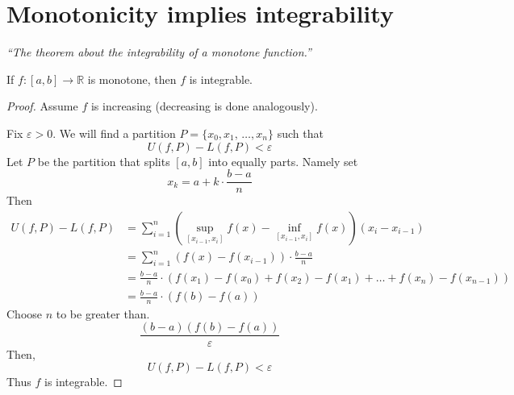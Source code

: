 \documentclass[12pt]{report}
\begin{document}
    \section{Monotonicity implies integrability}
    \textit{``The theorem about the integrability of a monotone function.''} \vspace{3mm}
    \begin{theorem}
        If \(f:[a,b] \to \mathbb{R}\) is monotone, then \(f\) is integrable.
    \end{theorem}
    \begin{proof}
        Assume \(f\) is increasing (decreasing is done analogously).

        Fix \(\varepsilon > 0\). We will find a partition \(P = \{x_0, x_1, \, \dots, x_n\}\) such that 
        \[U(f,P) - L(f,P) < \varepsilon\]
        Let \(P\) be the partition that splits \([a,b]\) into equally parts. Namely set
        \[x_k = a + k \cdot \frac{b-a}{n}\]
        Then
        \begin{align*}
            U(f,P) - L(f,P) &= \sum^n _{i=1} \left( \underset{[x_{i-1}, x_i]}{\sup} f(x) - \underset{[x_{i-1}, x_i]}{\inf} f(x)\right) \left(x_i - x_{i-1}\right)\\
            &= \sum^n_{i=1} \left(f(x) - f(x_{i-1})\right) \cdot \frac{b-a}{n}\\
            &= \frac{b-a}{n} \cdot \left(f(x_1) - f(x_0) + f(x_2) - f(x_1)+ \dots + f(x_n) - f(x_{n-1})\right)\\
            &= \frac{b-a}{n} \cdot \left(f(b) - f(a)\right)
        \end{align*}
        Choose \(n\) to be greater than.
        \[\frac{(b-a)(f(b) - f(a))}{\varepsilon}\]
        Then,
        \[U(f,P) - L(f,P) < \varepsilon\]
        Thus \(f\) is integrable.
    \end{proof}\newpage
\end{document}
